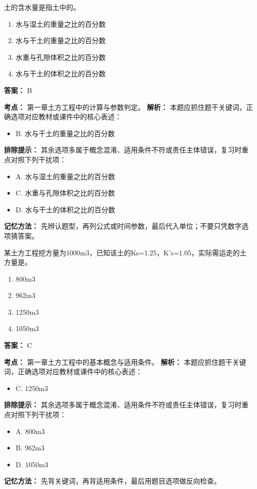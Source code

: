 \documentclass[UTF8,fontset=fandol,11pt]{ctexart}
\begin{document}
\begin{quizbox}[title={第 2 题}]
土的含水量是指土中的。\\
\begin{enumerate}[label=\Alph*.]
\item 水与湿土的重量之比的百分数
\item 水与干土的重量之比的百分数
\item 水重与孔隙体积之比的百分数
\item 水与干土的体积之比的百分数
\end{enumerate}
\textbf{答案：} B
\vspace{0.25em}
\begin{answerbox}[title={考点解析}]
\textbf{考点：} 第一章土方工程中的计算与参数判定。
\textbf{解析：} 本题应抓住题干关键词，正确选项对应教材或课件中的核心表述：
\begin{itemize}
\item B. 水与干土的重量之比的百分数
\end{itemize}
\textbf{排除提示：} 其余选项多属于概念混淆、适用条件不符或责任主体错误，复习时重点对照下列干扰项：
\begin{itemize}
\item A. 水与湿土的重量之比的百分数
\item C. 水重与孔隙体积之比的百分数
\item D. 水与干土的体积之比的百分数
\end{itemize}
\textbf{记忆方法：} 先辨认题型，再列公式或时间参数，最后代入单位；不要只凭数字选项猜答案。
\end{answerbox}
\end{quizbox}

\vspace{0.2em}

\begin{quizbox}[title={第 3 题}]
某土方工程挖方量为1000m3，已知该土的Ks=1.25，K’s=1.05，实际需运走的土方量是。\\
\begin{enumerate}[label=\Alph*.]
\item 800m3
\item 962m3
\item 1250m3
\item 1050m3
\end{enumerate}
\textbf{答案：} C
\vspace{0.25em}
\begin{answerbox}[title={考点解析}]
\textbf{考点：} 第一章土方工程中的基本概念与适用条件。
\textbf{解析：} 本题应抓住题干关键词，正确选项对应教材或课件中的核心表述：
\begin{itemize}
\item C. 1250m3
\end{itemize}
\textbf{排除提示：} 其余选项多属于概念混淆、适用条件不符或责任主体错误，复习时重点对照下列干扰项：
\begin{itemize}
\item A. 800m3
\item B. 962m3
\item D. 1050m3
\end{itemize}
\textbf{记忆方法：} 先背关键词，再背适用条件，最后用题目选项做反向检查。
\end{answerbox}
\end{quizbox}
\end{document}
